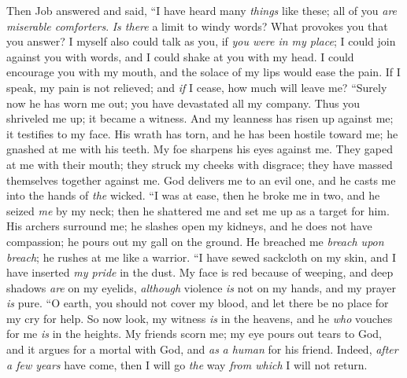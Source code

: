 \begin{biblechapter} %
 Then Job answered and said,
\verse “I have heard many \textit{things} like these; 
all of you \textit{are} \textit{miserable comforters}.
\verse \textit{Is there} a limit to windy words? 
What provokes you that you answer?
\verse I myself also could talk as you, 
if \textit{you were in my place}; 
I could join against you with words, 
and I could shake at you with my head.
\verse I could encourage you with my mouth, 
and the solace of my lips would ease the pain.
\verse If I speak, my pain is not relieved; 
and \textit{if} I cease, how much will leave me?
\verse “Surely now he has worn me out; 
you have devastated all my company.
\verse Thus you shriveled me up; 
it became a witness. 
And my leanness has risen up against me; 
it testifies to my face.
\verse His wrath has torn, and he has been hostile toward me; 
he gnashed at me with his teeth. 
My foe sharpens his eyes against me.
\verse They gaped at me with their mouth; 
they struck my cheeks with disgrace; 
they have massed themselves together against me.
\verse God delivers me to an evil one, 
and he casts me into the hands of \textit{the} wicked.
\verse “I was at ease, then he broke me in two, 
and he seized \textit{me} by my neck; 
then he shattered me 
and set me up as a target for him.
\verse His archers surround me; 
he slashes open my kidneys, and he does not have compassion; 
he pours out my gall on the ground.
\verse He breached me \textit{breach upon breach}; 
he rushes at me like a warrior.
\verse “I have sewed sackcloth on my skin, 
and I have inserted \textit{my pride} in the dust.
\verse My face is red because of weeping, 
and deep shadows \textit{are} on my eyelids,
\verse \textit{although} violence \textit{is} not on my hands, 
and my prayer \textit{is} pure.
\verse “O earth, you should not cover my blood, 
and let there be no place for my cry for help.
\verse So now look, my witness \textit{is} in the heavens, 
and he \textit{who} vouches for me \textit{is} in the heights.
\verse My friends scorn me; 
my eye pours out tears to God,
\verse and it argues for a mortal with God, 
and \textit{as} \textit{a human} for his friend.
\verse Indeed, \textit{after} \textit{a few years} have come, 
then I will go \textit{the} way \textit{from which} I will not return.
\end{biblechapter}

